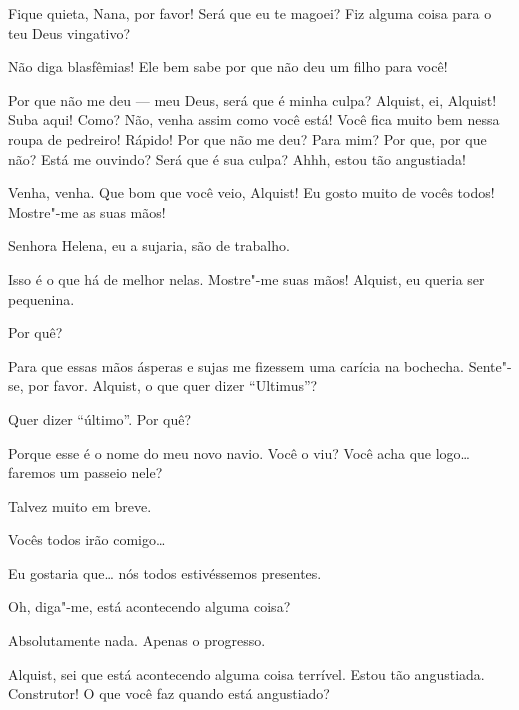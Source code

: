  Fique quieta, Nana, por favor! Será que eu te magoei? Fiz alguma coisa
para o teu Deus vingativo?

  Não diga blasfêmias! Ele bem sabe por que não deu
um filho para você! 

  Por que não me deu --- meu Deus, será que é minha
culpa?  Alquist, ei, Alquist! Suba aqui! Como? Não, venha assim
como você está! Você fica muito bem nessa roupa de pedreiro! Rápido!
 Por que não me deu? Para mim?  Por que, por que não? Está me ouvindo? Será que é sua culpa?
 Ahhh, estou tão angustiada! 


  Venha, venha. Que bom que você veio, Alquist! Eu gosto muito
de vocês todos! Mostre"-me as suas mãos!

  Senhora Helena, eu a sujaria, são de
trabalho.

 Isso é o que há de melhor nelas. Mostre"-me suas mãos!  Alquist, eu queria ser pequenina.

 Por quê?

 Para que essas mãos ásperas e sujas me fizessem uma carícia na bochecha.
Sente"-se, por favor. Alquist, o que quer dizer ``Ultimus''?

 Quer dizer ``último''. Por quê?

 Porque esse é o nome do meu novo navio. Você o viu? Você acha que logo\ldots{}
faremos um passeio nele?

 Talvez muito em breve.

 Vocês todos irão comigo\ldots{}

 Eu gostaria que\ldots{} nós todos estivéssemos presentes.

 Oh, diga"-me, está acontecendo alguma coisa?

 Absolutamente nada. Apenas o progresso.

 Alquist, sei que está acontecendo alguma coisa terrível. Estou tão
angustiada. Construtor! O que você faz quando está angustiado?

